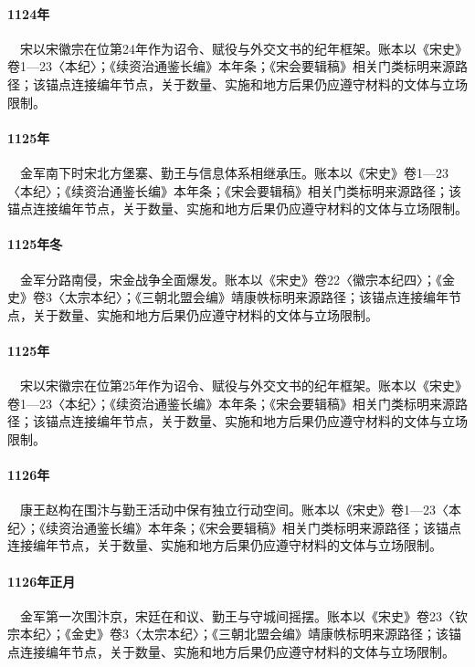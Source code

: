 \paragraph{1124年}　宋以宋徽宗在位第24年作为诏令、赋役与外交文书的纪年框架。账本以《宋史》卷1—23〈本纪〉；《续资治通鉴长编》本年条；《宋会要辑稿》相关门类标明来源路径；该锚点连接编年节点，关于数量、实施和地方后果仍应遵守材料的文体与立场限制。

\paragraph{1125年}　金军南下时宋北方堡寨、勤王与信息体系相继承压。账本以《宋史》卷1—23〈本纪〉；《续资治通鉴长编》本年条；《宋会要辑稿》相关门类标明来源路径；该锚点连接编年节点，关于数量、实施和地方后果仍应遵守材料的文体与立场限制。

\paragraph{1125年冬}　金军分路南侵，宋金战争全面爆发。账本以《宋史》卷22〈徽宗本纪四〉；《金史》卷3〈太宗本纪〉；《三朝北盟会编》靖康帙标明来源路径；该锚点连接编年节点，关于数量、实施和地方后果仍应遵守材料的文体与立场限制。

\paragraph{1125年}　宋以宋徽宗在位第25年作为诏令、赋役与外交文书的纪年框架。账本以《宋史》卷1—23〈本纪〉；《续资治通鉴长编》本年条；《宋会要辑稿》相关门类标明来源路径；该锚点连接编年节点，关于数量、实施和地方后果仍应遵守材料的文体与立场限制。

\paragraph{1126年}　康王赵构在围汴与勤王活动中保有独立行动空间。账本以《宋史》卷1—23〈本纪〉；《续资治通鉴长编》本年条；《宋会要辑稿》相关门类标明来源路径；该锚点连接编年节点，关于数量、实施和地方后果仍应遵守材料的文体与立场限制。

\paragraph{1126年正月}　金军第一次围汴京，宋廷在和议、勤王与守城间摇摆。账本以《宋史》卷23〈钦宗本纪〉；《金史》卷3〈太宗本纪〉；《三朝北盟会编》靖康帙标明来源路径；该锚点连接编年节点，关于数量、实施和地方后果仍应遵守材料的文体与立场限制。

